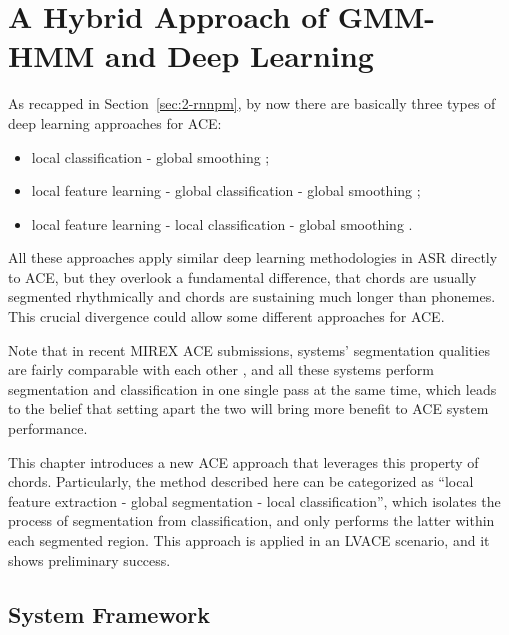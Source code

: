 
\chapter{A Hybrid Approach of GMM-HMM and Deep Learning}\label{cp:ghmm} %


As recapped in Section~\ref{sec:2-rnnpm}, by now there are basically three types of deep learning approaches for ACE:
\begin{itemize}
\item local classification - global smoothing \cite{humphrey2012rethinking};
\item local feature learning - global classification - global smoothing \cite{boulanger2013audio,sigtia2015audio};
\item local feature learning - local classification - global smoothing \cite{zhou2015chord}.
\end{itemize}
All these approaches apply similar deep learning methodologies in ASR \cite{deng2014deep,bourlard2012connectionist} directly to ACE, but they overlook a fundamental difference, that chords are usually segmented rhythmically and chords are sustaining much longer than phonemes. This crucial divergence could allow some different approaches for ACE.

Note that in recent MIREX ACE submissions, systems' segmentation qualities are fairly comparable with each other \cite{burgoyne2014comparative}, and all these systems perform segmentation and classification in one single pass at the same time, which leads to the belief that setting apart the two will bring more benefit to ACE system performance.

This chapter introduces a new ACE approach that leverages this property of chords. Particularly, the method described here can be categorized as ``local feature extraction - global segmentation - local classification'', which isolates the process of segmentation from classification, and only performs the latter within each segmented region. This approach is applied in an LVACE scenario, and it shows preliminary success.


\section{System Framework} \label{sec:3-sysframe}

